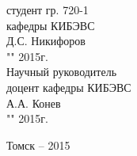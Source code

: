 \begin{singlespace}
%  
% 
 \hfill
 \begin{minipage}{0.42\linewidth}
 студент гр. 720-1 \\
 кафедры КИБЭВС \\
 \underline{\hspace{2.5cm}}Д.С. Никифоров \\
 "\underline{\hspace{1cm}}"\underline{\hspace{3cm}} 2015г.\\
 
 Научный руководитель \\
 доцент кафедры КИБЭВС \\
 \underline{\hspace{2.5cm}}А.А. Конев \\
 "\underline{\hspace{1cm}}"\underline{\hspace{3cm}} 2015г.\\
 \end{minipage}
\end{singlespace}

\vfill
\begin{center}
Томск -- 2015
\end{center}
